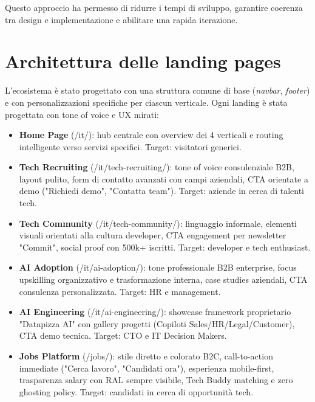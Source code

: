 Questo approccio ha permesso di ridurre i tempi di sviluppo, garantire coerenza tra design e implementazione e abilitare una rapida iterazione.

\section{Architettura delle landing pages}
L'ecosistema è stato progettato con una struttura comune di base (\textit{navbar}, 
\textit{footer}) e con personalizzazioni specifiche per ciascun verticale. 
Ogni landing è stata progettata con tone of voice e UX mirati:

\begin{itemize}
  \item \textbf{Home Page} (/it/): hub centrale con overview dei 4 verticali e 
  routing intelligente verso servizi specifici. Target: visitatori generici.
  
  \item \textbf{Tech Recruiting} (/it/tech-recruiting/): tone of voice 
  consulenziale B2B, layout pulito, form di contatto avanzati con campi aziendali, 
  CTA orientate a demo ("Richiedi demo", "Contatta team"). Target: aziende in 
  cerca di talenti tech.
  
  \item \textbf{Tech Community} (/it/tech-community/): linguaggio informale, 
  elementi visuali orientati alla cultura developer, CTA engagement per newsletter 
  "Commit", social proof con 500k+ iscritti. Target: developer e tech enthusiast.
  
  \item \textbf{AI Adoption} (/it/ai-adoption/): tone professionale B2B enterprise, 
  focus upskilling organizzativo e trasformazione interna, case studies aziendali, 
  CTA consulenza personalizzata. Target: HR e management.
  
  \item \textbf{AI Engineering} (/it/ai-engineering/): showcase framework 
  proprietario "Datapizza AI" con gallery progetti (Copiloti Sales/HR/Legal/Customer), 
  CTA demo tecnica. Target: CTO e IT Decision Makers.
  
  \item \textbf{Jobs Platform} (/jobs/): stile diretto e colorato B2C, 
  call-to-action immediate ("Cerca lavoro", "Candidati ora"), esperienza 
  mobile-first, trasparenza salary con RAL sempre visibile, Tech Buddy matching 
  e zero ghosting policy. Target: candidati in cerca di opportunità tech.
\end{itemize}

